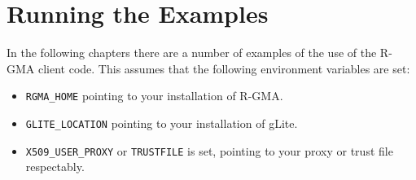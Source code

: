 \section{Running the Examples}

In the following chapters there are a number of examples of the use of
the R-GMA client code. This assumes that the following environment
variables are set:

\begin{itemize}
\item\verb!RGMA_HOME! pointing to your installation of R-GMA.
\item\verb!GLITE_LOCATION! pointing to your installation of gLite.
\item\verb!X509_USER_PROXY! or \verb!TRUSTFILE! is set, pointing
  to your proxy or trust file respectably.
\end{itemize}
